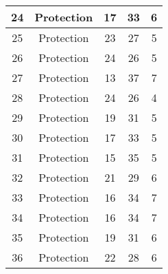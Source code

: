 \documentclass[results.tex]{subfiles}
\begin{document}
\begin{center}
\begin{tabular}{| c || c | c | c | c |}
            \hline
            24                      & Protection                   & 17                     & 33                      & 6                    \\
            \hline
            25                      & Protection                   & 23                     & 27                      & 5                    \\
            \hline
            26                      & Protection                   & 24                     & 26                      & 5                    \\
            \hline
            27                      & Protection                   & 13                     & 37                      & 7                    \\
            \hline
            28                      & Protection                   & 24                     & 26                      & 4                    \\
            \hline
            29                      & Protection                   & 19                     & 31                      & 5                    \\
            \hline
            30                      & Protection                   & 17                     & 33                      & 5                    \\
            \hline
            31                      & Protection                   & 15                     & 35                      & 5                    \\
            \hline
            32                      & Protection                   & 21                     & 29                      & 6                    \\
            \hline
            33                      & Protection                   & 16                     & 34                      & 7                    \\
            \hline
            34                      & Protection                   & 16                     & 34                      & 7                    \\
            \hline
            35                      & Protection                   & 19                     & 31                      & 6                    \\
            \hline
            36                      & Protection                   & 22                     & 28                      & 6                    \\

\end{tabular}
\end{center}
\end{document}
